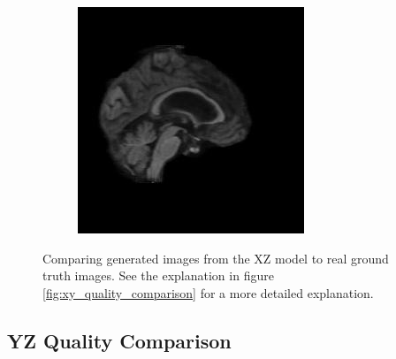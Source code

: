 \documentclass[11pt, fleqn, titlepage]{article}
\newcommand\skipperer{0.45pt}
\newcommand{\1}[1]{\mathds{1}\left[#1\right]}
\begin{document}
\begin{figure}[H]
\begin{subfigure}[b]{0.7\textwidth}
		\hskip\skipperer
		\includegraphics[width=0.22\linewidth]{imgs/082_S_0469/XZ_model_082_S_0469_yz_3}
	\end{subfigure}
	\caption{Comparing generated images from the XZ model to real ground truth images. See the explanation in figure \ref{fig:xy_quality_comparison} for a more detailed explanation.}
	\label{fig:xz_quality_comparison}
\end{figure}

\subsection{YZ Quality Comparison}\label{yz_generated}
\end{document}

